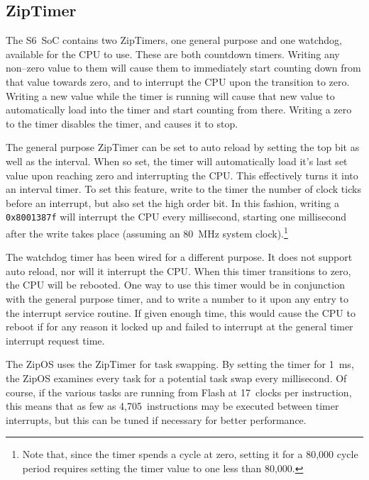 \documentclass{gqtekspec}
\begin{document}
\subsection{ZipTimer}
The S6~SoC contains two ZipTimers, one general purpose and one watchdog,
available for the CPU to use.  These are both countdown timers.  Writing any
non--zero value to them will cause them to immediately start counting down
from that value towards zero, and to interrupt the CPU upon the transition to
zero.  Writing a new value while the timer is
running will cause that new value to automatically load into the timer and
start counting from there.  Writing a zero to the timer disables the timer, and
causes it to stop.

The general purpose ZipTimer can be set to auto reload by setting the top bit
as well as the interval.  When so set, the timer will automatically
load it's last set value upon reaching zero and interrupting the CPU.  This
effectively turns it into an interval timer.  To set this feature,
write to the timer the number of clock ticks before an interrupt, but also set
the high order bit.  In this fashion, writing a {\tt 0x8001387f} will interrupt
the CPU every millisecond, starting one millisecond after the write takes place
(assuming an 80~MHz system clock).\footnote{Note that, since the timer spends
a cycle at zero, setting it for a 80,000 cycle period requires setting the
timer value to one less than 80,000.}

The watchdog timer has been wired for a different purpose.  It does not support
auto reload, nor will it interrupt the CPU.  When this timer transitions to
zero, the CPU will be rebooted.  One way to use this timer would be in
conjunction with the general purpose timer, and to write a number to it upon
any entry to the interrupt service routine.  If given enough time, this would
cause the CPU to reboot if for any reason it locked up and failed to interrupt
at the general timer interrupt request time.

The ZipOS uses the ZipTimer for task swapping.  By setting the timer for
1~ms, the ZipOS examines every task for a potential task swap every millisecond.
Of course, if the various tasks are running from Flash at 17~clocks per
instruction, this means that as few as \hbox{4,705~instructions} may be executed
between timer interrupts, but this can be tuned if necessary for better
performance.
\end{document}
